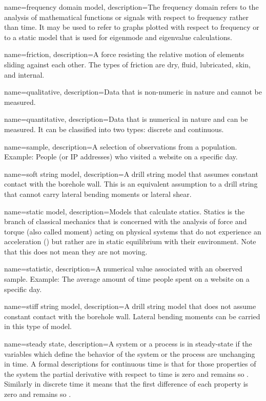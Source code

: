 {
	name=frequency domain model,
    description=The frequency domain refers to the analysis of mathematical functions or signals with respect to frequency\comma{} rather than time.  It may be used to refer to graphs plotted with respect to frequency or to a static model that is used for eigenmode and eigenvalue calculations.
}

{
	name=friction,
	description={A force resisting the relative motion of elements sliding against each other.  The types of friction are dry, fluid, lubricated, skin, and internal.}
}

{
	name=qualitative,
	description={Data that is non-numeric in nature and cannot be measured.}
}

{
	name=quantitative,
	description={Data that is numerical in nature and can be measured.  It can be classified into two types: discrete and continuous.}
}

{
	name=sample,
	description={A selection of observations from a population.  Example: People (or IP addresses) who visited a website on a specific day.}
}

{
	name=soft string model,
	description={A drill string model that assumes constant contact with the borehole wall.  This is an equivalent assumption to a drill string that cannot carry lateral bending moments or lateral shear.}
}

{
	name=static model,
    description=Models that calculate statics.  Statics is the branch of classical mechanics that is concerned with the analysis of force and torque (also called moment) acting on physical systems that do not experience an acceleration (\staticforcebalance)\comma{} but rather\comma{} are in static equilibrium with their environment.  Note that this does not mean they are not moving.
}

{
	name=statistic,
	description={A numerical value associated with an observed sample.  Example: The average amount of time people spent on a website on a specific day.}
}

{
	name=stiff string model,
	description={A drill string model that does not assume constant contact with the borehole wall.  Lateral bending moments can be carried in this type of model.}
}

{
	name=steady state,
    description=A system or a process is in steady-state if the variables which define the behavior of the system or the process are unchanging in time.  A formal descriptions for continuous time\comma{} is that for those properties \systemproperty{} of the system\comma{} the partial derivative with respect to time is zero and remains so \continuoussteadystate{}.  Similarly\comma{} in discrete\comma{} time it means that the first difference of each property is zero and remains so \discretesteadystate{}.
}


